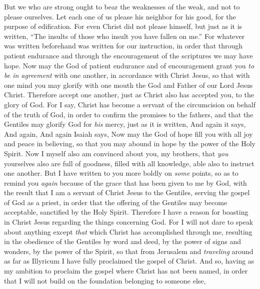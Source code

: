 \begin{biblechapter} %
 But we who are strong ought to bear the weaknesses of the weak, and not to please ourselves.
\verse Let each one of us please his neighbor for his good, for the purpose of edification.
\verse For even Christ did not please himself, but just as it is written, “The insults of those who insult you have fallen on me.”
\verse For whatever was written beforehand was written for our instruction, in order that through patient endurance and through the encouragement of the scriptures we may have hope.
\verse Now may the God of patient endurance and of encouragement grant you \textit{to be in agreement} with one another, in accordance with Christ Jesus,
\verse so that with one mind you may glorify with one mouth the God and Father of our Lord Jesus Christ.
\verse Therefore accept one another, just as Christ also has accepted you, to the glory of God.
\verse For I say, Christ has become a servant of the circumcision on behalf of the truth of God, in order to confirm the promises to the fathers,
\verse and that the Gentiles may glorify God for \textit{his} mercy, just as it is written,
\verse And again it says,
\verse And again,
\verse And again Isaiah says,
\verse Now may the God of hope fill you with all joy and peace in believing, so that you may abound in hope by the power of the Holy Spirit.
 Now I myself also am convinced about you, my brothers, that \textit{you} yourselves also are full of goodness, filled with all knowledge, able also to instruct one another.
\verse But I have written to you more boldly on \textit{some} points, so as to remind you \textit{again} because of the grace that has been given to me by God,
\verse with the result that I am a servant of Christ Jesus to the Gentiles, serving the gospel of God as a priest, in order that the offering of the Gentiles may become acceptable, sanctified by the Holy Spirit.
\verse Therefore I have a reason for boasting in Christ Jesus regarding the things concerning God.
\verse For I will not dare to speak about anything except \textit{that} which Christ has accomplished through me, resulting in the obedience of the Gentiles by word and deed,
\verse by the power of signs and wonders, by the power of the Spirit, so that from Jerusalem and \textit{traveling} around as far as Illyricum I have fully proclaimed the gospel of Christ.
\verse And so, having as my ambition to proclaim the gospel where Christ has not been named, in order that I will not build on the foundation belonging to someone else,

\end{biblechapter}
